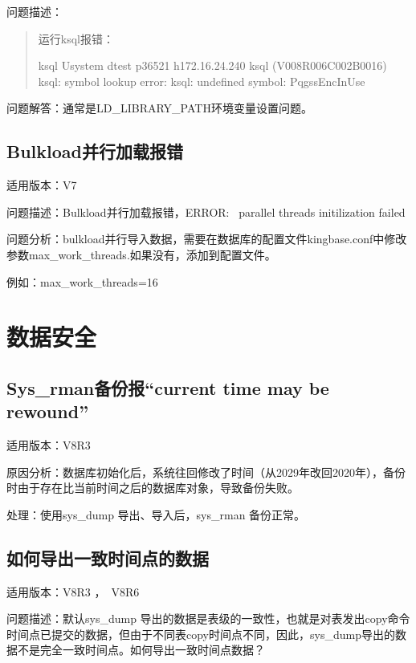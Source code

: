 \documentclass[letterpaper,10pt,english]{sphinxmanual}
\begin{document}
问题描述：
\begin{quote}

运行ksql报错：

\begin{sphinxVerbatim}[commandchars=\\\{\}]
\PYGZdl{} ksql \PYGZhy{}Usystem \PYGZhy{}dtest \PYGZhy{}p36521 \PYGZhy{}h172.16.24.240
ksql (V008R006C002B0016)
ksql: symbol lookup error: ksql: undefined symbol: PqgssEncInUse
\end{sphinxVerbatim}
\end{quote}

问题解答：通常是LD\_LIBRARY\_PATH环境变量设置问题。


\section{Bulkload并行加载报错}
\label{\detokenize{tools:bulkload}}
适用版本：V7

问题描述：Bulkload并行加载报错，ERROR:  parallel threads initilization failed

问题分析：bulkload并行导入数据，需要在数据库的配置文件kingbase.conf中修改参数max\_work\_threads.如果没有，添加到配置文件。

例如：max\_work\_threads=16


\chapter{数据安全}
\label{\detokenize{data-security:id1}}\label{\detokenize{data-security::doc}}

\section{Sys\_rman备份报“current time may be rewound”}
\label{\detokenize{data-security:sys-rmancurrent-time-may-be-rewound}}
适用版本：V8R3

原因分析：数据库初始化后，系统往回修改了时间（从2029年改回2020年），备份时由于存在比当前时间之后的数据库对象，导致备份失败。

处理：使用sys\_dump 导出、导入后，sys\_rman 备份正常。


\section{如何导出一致时间点的数据}
\label{\detokenize{data-security:id2}}
适用版本：V8R3 ， V8R6

问题描述：默认sys\_dump 导出的数据是表级的一致性，也就是对表发出copy命令时间点已提交的数据，但由于不同表copy时间点不同，因此，sys\_dump导出的数据不是完全一致时间点。如何导出一致时间点数据？
\end{document}

